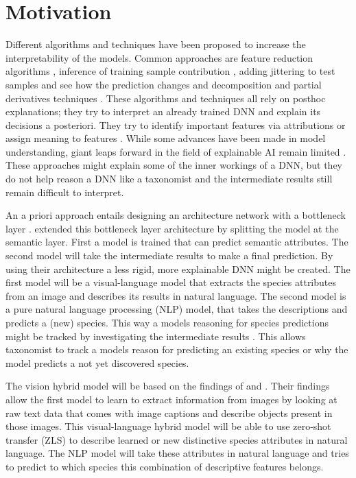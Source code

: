 \documentclass[a4paper, 12pt, oneside]{book} %
\begin{document}
\section{Motivation}
Different algorithms and techniques have been proposed to increase the interpretability of the models.
Common approaches are feature reduction algorithms \autocite{ribeiro_why_2016}, inference of training sample contribution \autocite{koh_understanding_2020}, adding jittering to test samples and see how the prediction changes \autocite{li_understanding_2017} and decomposition and partial derivatives techniques \autocite{samek_explainable_2017}.
These algorithms and techniques all rely on posthoc explanations; they try to interpret an already trained DNN and explain its decisions a posteriori.
They try to identify important features via attributions \autocite{zintgraf_visualizing_2017, selvaraju_grad-cam_2017} or assign meaning to features \autocite{fleet_visualizing_2014}.
While some advances have been made in model understanding, giant leaps forward in the field of explainable AI remain limited \autocite{lipton_mythos_2017, li_interpretable_2021}.
These approaches might explain some of the inner workings of a DNN, but they do not help reason a DNN like a taxonomist and the intermediate results still remain difficult to interpret. 

An a priori approach entails designing an architecture network with a bottleneck layer \autocite{bucher_semantic_2019}. 
\textcite{ishikawa_contextual_2021} extended this bottleneck layer architecture by splitting the model at the semantic layer.
First a model is trained that can predict semantic attributes.
The second model will take the intermediate results to make a final prediction.
By using their architecture a less rigid, more explainable DNN might be created.
The first model will be a visual-language model that extracts the species attributes from an image and describes its results in natural language. 
The second model is a pure natural language processing (NLP) model, that takes the descriptions and predicts a (new) species.
This way a models reasoning for species predictions might be tracked by investigating the intermediate results \autocite{ishikawa_contextual_2021}.
This allows taxonomist to track a models reason for predicting an existing species or why the model predicts a not yet discovered species.

The vision hybrid model will be based on the findings of \textcite{radford_learning_2021} and \textcite{huang_interpretable_2020}.
Their findings allow the first model to learn to extract information from images by looking at raw text data that comes with image captions and describe objects present in those images.
This visual-language hybrid model will be able to use zero-shot transfer (ZLS) to describe learned or new distinctive species attributes in natural language.
The NLP model will take these attributes in natural language and tries to predict to which species this combination of descriptive features belongs.
\end{document}
